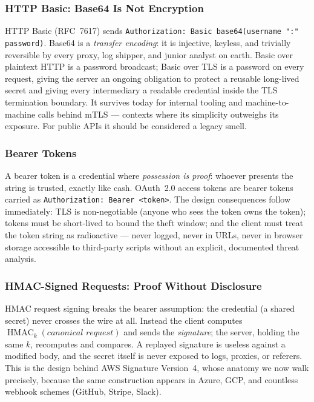 \subsubsection{HTTP Basic: Base64 Is Not Encryption}

HTTP Basic (RFC~7617) sends \texttt{Authorization: Basic
base64(username ":" password)}. Base64 is a \emph{transfer encoding}: it is
injective, keyless, and trivially reversible by every proxy, log shipper,
and junior analyst on earth. Basic over plaintext HTTP is a password
broadcast; Basic over TLS is a password on every request, giving the server
an ongoing obligation to protect a reusable long-lived secret and giving
every intermediary a readable credential inside the TLS termination
boundary. It survives today for internal tooling and machine-to-machine
calls behind mTLS --- contexts where its simplicity outweighs its exposure.
For public APIs it should be considered a legacy smell.

\subsubsection{Bearer Tokens}

A bearer token is a credential where \emph{possession is proof}: whoever
presents the string is trusted, exactly like cash. OAuth~2.0 access tokens
are bearer tokens carried as \texttt{Authorization: Bearer <token>}. The
design consequences follow immediately: TLS is non-negotiable (anyone who
sees the token owns the token); tokens must be short-lived to bound the
theft window; and the client must treat the token string as radioactive ---
never logged, never in URLs, never in browser storage accessible to
third-party scripts without an explicit, documented threat analysis.

\subsubsection{HMAC-Signed Requests: Proof Without Disclosure}

HMAC request signing breaks the bearer assumption: the credential (a shared
secret) never crosses the wire at all. Instead the client computes
$\operatorname{HMAC}_k(\textit{canonical request})$ and sends the
\emph{signature}; the server, holding the same $k$, recomputes and compares.
A replayed signature is useless against a modified body, and the secret
itself is never exposed to logs, proxies, or referers. This is the design
behind AWS Signature Version~4, whose anatomy we now walk precisely, because
the same construction appears in Azure, GCP, and countless webhook schemes
(GitHub, Stripe, Slack).


